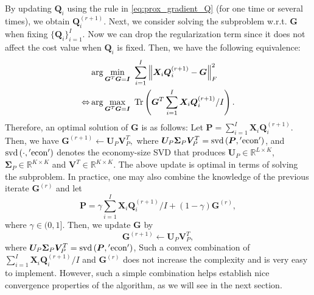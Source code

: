 \documentclass[10pt,journal]{IEEEtran}
\newtheorem{Remark}{Remark}
\newcommand{\G}{\boldsymbol{G}}
\newcommand{\Q}{\boldsymbol{Q}}
\begin{document}
By updating $\Q_i$ using the rule in \eqref{eq:prox_gradient_Q} (for one time or several times), we obtain
$\Q_i^{(r+1)}$.
Next, we consider solving the subproblem w.r.t. ${\bm G}$ when fixing $\{{\bm Q}_i\}_{i=1}^I$.
Now we can drop the regularization term since it does not affect the cost value when $\Q_i$ is fixed.
Then, we have the following equivalence:
\begin{align*}
	&\arg\min_{{\bm G}^T{\bm G}={\bm I}}~\sum_{i=1}^I\left\|{\bm X}_i{\bm Q}_i^{(r+1)}-{\bm G}\right\|_F^2\\
	\Leftrightarrow &\arg\max_{{\bm G}^T{\bm G}={\bm I}}~{\rm Tr}\left({\bm G}^T\sum_{i=1}^I{\bm X}_i{\bm Q}_i^{(r+1)}/I\right). \label{eq:G_sln}
\end{align*}
Therefore, an optimal solution of ${\bm G}$ is as follows:
Let ${\bm P}=\sum_{i=1}^I{\bm X}_i{\bm Q}_i^{(r+1)}.$
Then, we have 
${\bm G}^{(r+1)} \leftarrow {\bm U}_P{\bm V}^T_P,$ 
where ${\bm U}_P{\bm \Sigma}_P{\bm V}^T_P = {\rm svd}\left({\bm P},{\rm 'econ'}\right)$,
and ${\rm svd}\left(\cdot,{\rm 'econ'}\right)$ denotes the economy-size SVD that produces ${\bm U}_P\in\mathbb{R}^{L\times K}$,
${\bm \Sigma}_P\in\mathbb{R}^{K\times K}$ and ${\bm V}^T\in\mathbb{R}^{K\times K}$.
The above update is optimal in terms of solving the subproblem. In practice, one may also combine the knowledge of the previous iterate $\G^{(r)}$ and let
\begin{equation}
 {\bm P}=\gamma\sum_{i=1}^I{\bm X}_i{\bm Q}_i^{(r+1)}/I + (1-\gamma)\G^{(r)}, 
\end{equation}
where $\gamma\in(0,1]$. 
Then, we update $\G$ by
\[{\bm G}^{(r+1)} \leftarrow {\bm U}_P{\bm V}^T_P,\] 
where ${\bm U}_P{\bm \Sigma}_P{\bm V}^T_P = {\rm svd}\left({\bm P},{\rm 'econ'}\right)$,
Such a convex combination of $\sum_{i=1}^I{\bm X}_i{\bm Q}_i^{(r+1)}/I$
and $\G^{(r)}$ does not increase the complexity and is very easy to implement.
However, such a simple combination helps establish nice convergence properties of the algorithm, as we will see in the next section.





\end{document}
